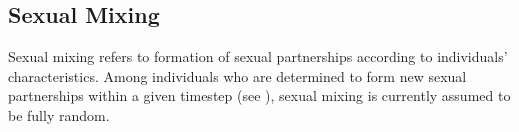 \subsection{Sexual Mixing}\label{mod.par.mix}
Sexual mixing refers to formation of sexual partnerships
according to individuals' characteristics.
Among individuals who are determined to form new sexual partnerships
within a given timestep (see ),
sexual mixing is currently assumed to be fully random.
